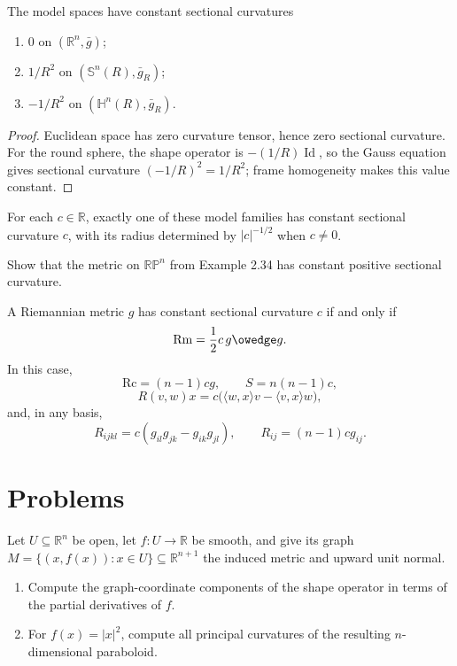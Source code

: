 \begin{theorem}
\label{thm:sectional-curvatures-model-spaces}
The model spaces have constant sectional curvatures
\begin{enumerate}
\item[(a)] $0$ on $(\mathbb R^n,\bar g)$;
\item[(b)] $1/R^2$ on $(\mathbb S^n(R),\bar g_R)$;
\item[(c)] $-1/R^2$ on $(\mathbb H^n(R),\bar g_R)$.
\end{enumerate}
\end{theorem}

\begin{proof}
\sketch
Euclidean space has zero curvature tensor, hence zero sectional curvature.
For the round sphere, the shape operator is $-(1/R)\operatorname{Id}$, so the
Gauss equation gives sectional curvature $(-1/R)^2=1/R^2$; frame homogeneity
makes this value constant.
\end{proof}

For each $c\in\mathbb R$, exactly one of these model families has constant
sectional curvature $c$, with its radius determined by $|c|^{-1/2}$ when
$c\ne0$.

\begin{exercise}
\label{exer:constant-sectional-curvature-rp}
Show that the metric on $\mathbb{RP}^n$ from Example 2.34 has constant positive
sectional curvature.
\end{exercise}

\begin{proposition}
\label{prop:constant-sectional-curvature}
A Riemannian metric $g$ has constant sectional curvature $c$ if and only if
\[
\mathrm{Rm}=\frac12c\,g\owedge g.
\]
In this case,
\[
\mathrm{Rc}=(n-1)cg,
\qquad
S=n(n-1)c,
\]
\[
R(v,w)x=c\bigl(\langle w,x\rangle v-\langle v,x\rangle w\bigr),
\]
and, in any basis,
\[
R_{ijkl}=c(g_{il}g_{jk}-g_{ik}g_{jl}),
\qquad
R_{ij}=(n-1)cg_{ij}.
\]
\end{proposition}
\section{Problems}

\begin{exercise}
\label{prob:graph-submanifold-shape}

Let $U\subseteq\mathbb R^n$ be open, let $f:U\to\mathbb R$ be smooth, and
give its graph
$M=\{(x,f(x)):x\in U\}\subseteq\mathbb R^{n+1}$ the induced metric and upward
unit normal.
\begin{enumerate}
\item[(a)] Compute the graph-coordinate components of the shape operator in
terms of the partial derivatives of $f$.
\item[(b)] For $f(x)=|x|^2$, compute all principal curvatures of the resulting
$n$-dimensional paraboloid.
\end{enumerate}
\end{exercise}

